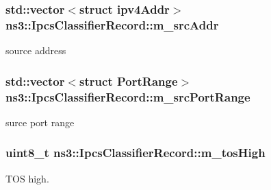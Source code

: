 \subsubsection[{\texorpdfstring{m\+\_\+src\+Addr}{m_srcAddr}}]{\setlength{\rightskip}{0pt plus 5cm}std\+::vector$<$struct {\bf ipv4\+Addr}$>$ ns3\+::\+Ipcs\+Classifier\+Record\+::m\+\_\+src\+Addr\hspace{0.3cm}{\ttfamily [private]}}\hypertarget{classns3_1_1IpcsClassifierRecord_a9135b69bdf633be39cc1f848ef2bcaf3}{}\label{classns3_1_1IpcsClassifierRecord_a9135b69bdf633be39cc1f848ef2bcaf3}


source address 

\subsubsection[{\texorpdfstring{m\+\_\+src\+Port\+Range}{m_srcPortRange}}]{\setlength{\rightskip}{0pt plus 5cm}std\+::vector$<$struct {\bf Port\+Range}$>$ ns3\+::\+Ipcs\+Classifier\+Record\+::m\+\_\+src\+Port\+Range\hspace{0.3cm}{\ttfamily [private]}}\hypertarget{classns3_1_1IpcsClassifierRecord_a8874820a9cc87b52444b2d4d3b739266}{}\label{classns3_1_1IpcsClassifierRecord_a8874820a9cc87b52444b2d4d3b739266}


surce port range 

\subsubsection[{\texorpdfstring{m\+\_\+tos\+High}{m_tosHigh}}]{\setlength{\rightskip}{0pt plus 5cm}uint8\+\_\+t ns3\+::\+Ipcs\+Classifier\+Record\+::m\+\_\+tos\+High\hspace{0.3cm}{\ttfamily [private]}}\hypertarget{classns3_1_1IpcsClassifierRecord_afa4c97d018dd7bc728631f7cecc24120}{}\label{classns3_1_1IpcsClassifierRecord_afa4c97d018dd7bc728631f7cecc24120}


T\+OS high. 

